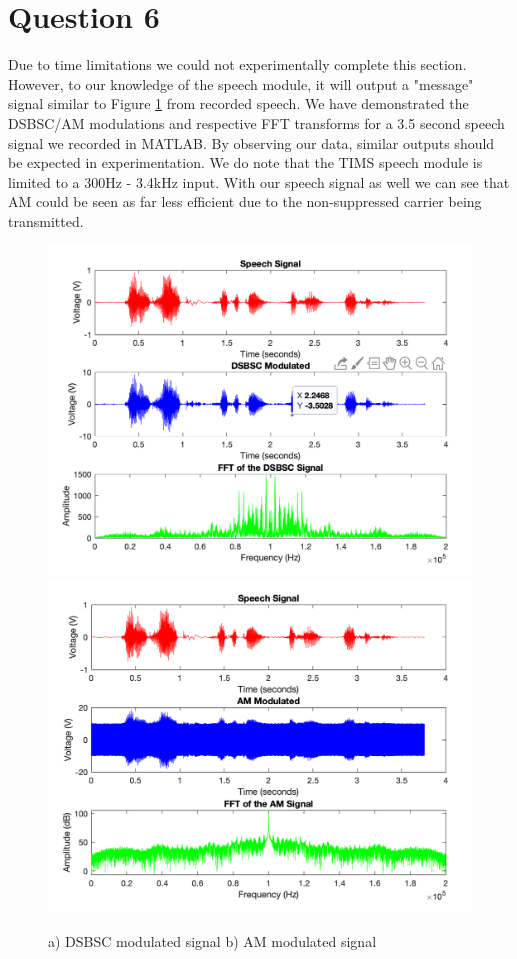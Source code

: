 \documentclass[11pt]{article}
\begin{document}
\section*{Question 6}
Due to time limitations we could not experimentally complete this section. However, to our knowledge of the speech module, it will output a "message" signal similar to Figure \ref{fig:q6} from recorded speech. We have demonstrated the DSBSC/AM modulations and respective FFT transforms for a 3.5 second speech signal we recorded in MATLAB. By observing our data, similar outputs should be expected in experimentation. We do note that the TIMS speech module is limited to a 300Hz - 3.4kHz input. With our speech signal as well we can see that AM could be seen as far less efficient due to the non-suppressed carrier being transmitted. 
\begin{figure}[H]
    \centering
    \includegraphics[scale=0.4]{W2Q6DSBSC.png}
    \includegraphics[scale=0.4]{W2Q6AM.png}
    \caption{a) DSBSC modulated signal b) AM modulated signal}
    \label{fig:q6}
\end{figure}
\end{document}
